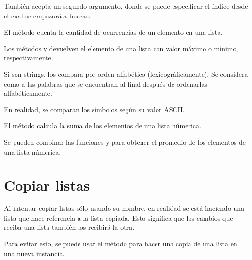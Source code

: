 
También acepta un segundo argumento, donde se puede especificar el índice desde el cual se empezará a buscar.


El método  cuenta la cantidad de ocurrencias de un elemento en una lista.
  

Los métodos  y  devuelven el elemento de una lista con valor máximo o mínimo, respectivamente.


Si son strings, los compara por orden alfabético (lexicográficamente).
Se considera como  a las palabras que se encuentran al final después de ordenarlas alfabéticamente.


En realidad, se comparan los símbolos según su valor ASCII.

El método  calcula la suma de los elementos de una lista númerica.
  

Se pueden combinar las funciones  y  para obtener el promedio de los elementos de una lista númerica.


\section{Copiar listas}

Al intentar copiar listas sólo usando su nombre, en realidad se está haciendo una lista que hace referencia a la lista copiada.
Esto significa que los cambios que reciba una lista también los recibirá la otra.


Para evitar esto, se puede usar el método  para hacer una copia de una lista en una nueva instancia.

